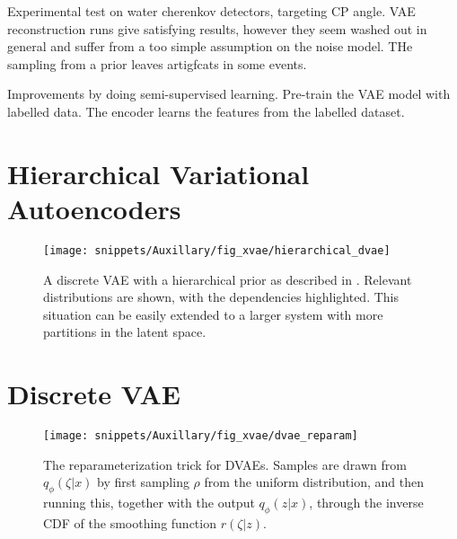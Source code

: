 Experimental test on water cherenkov detectors, targeting CP angle. VAE
reconstruction runs give satisfying results, however they seem washed out in
general and suffer from a too simple assumption on the noise model. THe sampling
from a prior leaves artigfcats in some events.

Improvements by doing semi-supervised learning. Pre-train the VAE model with
labelled data. The encoder learns the features from the labelled dataset.

\section{Hierarchical Variational Autoencoders}
\begin{figure} \centering
  \texttt{[image: snippets/Auxillary/fig\_xvae/hierarchical\_dvae]}
  \caption{A discrete VAE with a hierarchical prior as described in
  \cite{Khoshaman2019,Rolfe2016, Vahdat2018, Vahdat2018pp}. Relevant
  distributions are shown, with the dependencies highlighted. This situation can
  be easily extended to a larger system with more partitions in the latent
  space.} \label{fig:hierarchical_dvae} \end{figure}


\section{Discrete VAE}

\begin{figure}[h] \centering
  \texttt{[image: snippets/Auxillary/fig\_xvae/dvae\_reparam]}
  \caption{The reparameterization trick for DVAEs. Samples are drawn from
  $q_\phi(\zeta | x)$ by first sampling $\rho$ from the uniform distribution,
  and then running this, together with the output $q_\phi(z | x)$, through the
  inverse CDF of the smoothing function $r(\zeta | z)$.}
  \label{fig:dvae_reparam} \end{figure}

